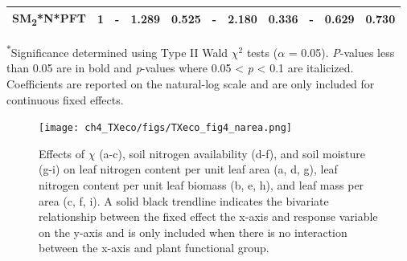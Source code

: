 \begin{landscape}
\begin{table}
{\begin{tabular}{p{3.75cm}p{0.5cm}p{1.75cm}p{1.5cm}p{1.5cm}p{1.75cm}p{1.5cm}p{1.5cm}p{1.75cm}p{1.5cm}p{1.5cm}}
            SM\textsubscript{2}*N*PFT & \multicolumn{1}{r}{1}
            & \multicolumn{1}{r}{-}             & \multicolumn{1}{r}{1.289}         & \multicolumn{1}{r}{0.525}
            & \multicolumn{1}{r}{-}             & \multicolumn{1}{r}{2.180}         & \multicolumn{1}{r}{0.336}
            & \multicolumn{1}{r}{-}             & \multicolumn{1}{r}{0.629}         & \multicolumn{1}{r}{0.730}
            \\
            \hline

    \end{tabular}}
    \label{tab:table4.4}
    \end{table}
    \noindent \textsuperscript{$*$}Significance determined using Type II Wald $\chi^{2}$ tests ($\alpha$ = 0.05). \textit{P}-values less than 0.05 are in bold and \textit{p}-values where 0.05 < \textit{p} < 0.1 are italicized. Coefficients are reported on the natural-log scale and are only included for continuous fixed effects.
\end{landscape}
\clearpage

\newpage
    \begin{figure}
        \centering
        \texttt{[image: ch4\_TXeco/figs/TXeco\_fig4\_narea.png]}
        \caption[Effects of $\chi$, soil nitrogen availability, and soil moisture on leaf nitrogen content per unit leaf area, leaf nitrogen content per unit leaf biomass, and leaf mass per area.]{Effects of $\chi$ (a-c), soil nitrogen availability (d-f), and soil moisture (g-i) on leaf nitrogen content per unit leaf area (a, d, g), leaf nitrogen content per unit leaf biomass (b, e, h), and leaf mass per area (c, f, i). A solid black trendline indicates the bivariate relationship between the fixed effect the x-axis and response variable on the y-axis and is only included when there is no interaction between the x-axis and plant functional group.}
        \label{fig:figure4.4}
    \end{figure}
\clearpage

